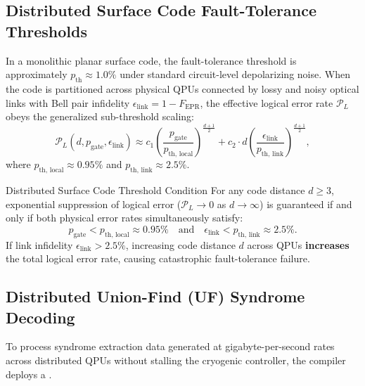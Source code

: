 \subsection{Distributed Surface Code Fault-Tolerance Thresholds}
\label{sec:distributed_thresholds}

In a monolithic planar surface code, the fault-tolerance threshold is approximately $p_{\text{th}} \approx 1.0\%$ under standard circuit-level depolarizing noise. When the code is partitioned across physical QPUs connected by lossy and noisy optical links with Bell pair infidelity $\epsilon_{\text{link}} = 1 - F_{\text{EPR}}$, the effective logical error rate $\mathcal{P}_L$ obeys the generalized sub-threshold scaling:
\begin{equation}
    \mathcal{P}_L(d, p_{\text{gate}}, \epsilon_{\text{link}}) \approx c_1 \left( \frac{p_{\text{gate}}}{p_{\text{th, local}}} \right)^{\frac{d+1}{2}} + c_2 \cdot d \left( \frac{\epsilon_{\text{link}}}{p_{\text{th, link}}} \right)^{\frac{d+1}{2}},
    \label{eq:distributed_threshold_scaling}
\end{equation}
where $p_{\text{th, local}} \approx 0.95\%$ and $p_{\text{th, link}} \approx 2.5\%$.

\begin{theorembox}{Distributed Surface Code Threshold Condition}
For any code distance $d \ge 3$, exponential suppression of logical error ($\mathcal{P}_L \to 0$ as $d \to \infty$) is guaranteed if and only if both physical error rates simultaneously satisfy:
\begin{equation}
    p_{\text{gate}} < p_{\text{th, local}} \approx 0.95\% \quad \text{and} \quad \epsilon_{\text{link}} < p_{\text{th, link}} \approx 2.5\%.
    \label{eq:threshold_conditions_joint}
\end{equation}
If link infidelity $\epsilon_{\text{link}} > 2.5\%$, increasing code distance $d$ across QPUs \textbf{increases} the total logical error rate, causing catastrophic fault-tolerance failure.
\end{theorembox}

\subsection{Distributed Union-Find (UF) Syndrome Decoding}
\label{sec:distributed_union_find}

To process syndrome extraction data generated at gigabyte-per-second rates across distributed QPUs without stalling the cryogenic controller, the compiler deploys a .

